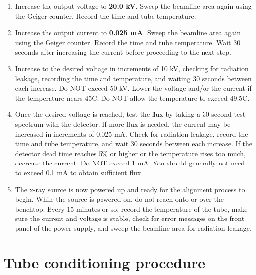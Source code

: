 \begin{enumerate}
\item Increase the output voltage to \textbf{20.0 kV}. Sweep the beamline area again using the Geiger counter. Record the time and tube temperature.

\item Increase the output current to \textbf{0.025 mA}. Sweep the beamline area again using the Geiger counter.  Record the time and tube temperature. Wait 30 seconds after increasing the current before proceeding to the next step.

\item Increase to the desired voltage in increments of 10 kV, checking for radiation leakage, recording the time and temperature, and waiting 30 seconds between each increase. Do NOT exceed 50 kV.  Lower the voltage and/or the current if the temperature nears 45C. Do NOT allow the temperature to exceed 49.5C.

\item Once the desired voltage is reached, test the flux by taking a 30 second test spectrum with the detector. If more flux is needed, the current may be increased in increments of 0.025 mA. Check for radiation leakage, record the time and tube temperature, and wait 30 seconds between each increase.  If the detector dead time reaches 5\% or higher or the temperature rises too much, decrease the current. Do NOT exceed 1 mA.  You should generally not need to exceed 0.1 mA to obtain sufficient flux.\label{item:finish}

\item The x-ray source is now powered up and ready for the alignment process to begin. While the source is powered on, do not reach onto or over the benchtop. Every 15 minutes or so, record the temperature of the tube, make sure the current and voltage is stable, check for error messages on the front panel of the power supply, and sweep the beamline area for radiation leakage.

\end{enumerate}

\section{Tube conditioning procedure}

